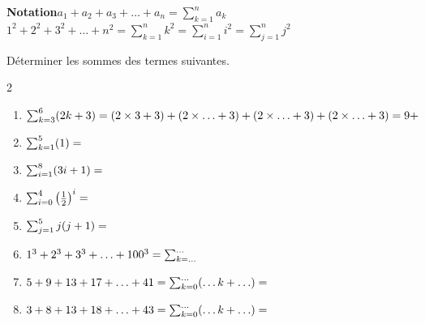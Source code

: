 \documentclass[main.tex]{subfiles}
\begin{document}
\begin{eBox}
\textbf{Notation}\hfill 	$a_1+a_2+a_3+\ldots +a_n=\sum_{k=1}^{n} a_k$ \hfill  $1^2+2^2+3^2+\ldots +n^2=\sum_{k=1}^n k^2=\sum_{i=1}^n i^2=\sum_{j=1}^n j^2$\hfill\null
\end{eBox}
\begin{exercise}\label{chapter05:exercise:suites53} 	Déterminer les sommes des termes   suivantes.
	\begin{spacing}{2}
		\vspace{-0.5em}
		\begin{enumerate}[leftmargin=*,label={}]
			\item $\sum_{k=3}^6(2k+3)=(2\times 3 +3) + (2\times \ldots +3)+(2\times \ldots +3)+(2\times \ldots +3)= 9+ \dotfill $
			\item  $\sum_{k=1}^5(1)=\dotfill $
			\item  $\sum_{i=1}^8(3i+1)=\dotfill $
			\item  $\sum_{i=0}^4\left(\frac{1}{2}\right)^i=\dotfill $
			\item $\sum_{j=1}^5 j(j+1)=\dotfill $
			\item $1^3+2^3+3^3+\ldots +100^3 = \sum_{k=\ldots}^{\ldots}\dotfill $
			\item $5+9+13+17 +\ldots + 41 = \sum_{k=0}^{\ldots}(\ldots k+ \ldots )=\dotfill $ 
			\item $3+8+13+18 +\ldots + 43 = \sum_{k=0}^{\ldots}(\ldots k+ \ldots )=\dotfill $
		\end{enumerate}
	\end{spacing}
	\vspace{-0.75em}
\end{exercise} 
\end{document}
